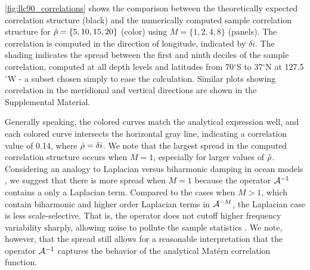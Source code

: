 \cref{fig:llc90_correlations} shows the comparison between the theoretically
expected correlation structure (black) and the numerically computed sample
correlation structure for
$\hat{\rho} = \{5, 10, 15, 20\}$ (color) using $M =\{1,2,4,8\}$ (panels).
The correlation is computed in the direction of longitude, indicated by
$\delta i$.
The shading indicates the spread between the first and ninth deciles of the
sample correlation, computed at all depth levels and latitudes from
70$^\circ$S to 37$^\circ$N at 127.5$^\circ$W - a subset chosen simply to ease the
calculation.
Similar plots showing correlation in the meridional and vertical directions are
shown in the Supplemental Material.

Generally speaking, the colored curves match the analytical expression well, and
each colored curve intersects the horizontal gray line, indicating a correlation
value of 0.14, where $\hat{\rho} = \delta i$.
We note that the largest spread in the computed correlation structure occurs
when $M=1$, especially for larger values of $\hat{\rho}$.
Considering an analogy to Laplacian versus biharmonic damping in ocean models
\citep[e.g.][]{holland_role_1978,griffies_biharmonic_2000}, we suggest that
there is more spread when $M=1$ because the operator $\mathcal{A}^{-1}$
contains a only a Laplacian term.
Compared to the cases when $M>1$, which contain biharmonic and higher order
Laplacian terms in $\mathcal{A}^{-M}$, the Laplacian case is less
scale-selective.
That is, the operator does not cutoff higher frequency variability sharply,
allowing noise to pollute the sample statistics \citep[see][Section 2 for a quantitative
description of this cutoff in frequency space]{griffies_biharmonic_2000}.
We note, however, that the spread still allows for a reasonable interpretation
that the operator $\mathcal{A}^{-1}$ captures the behavior of the analytical Mat\'ern correlation
function.

